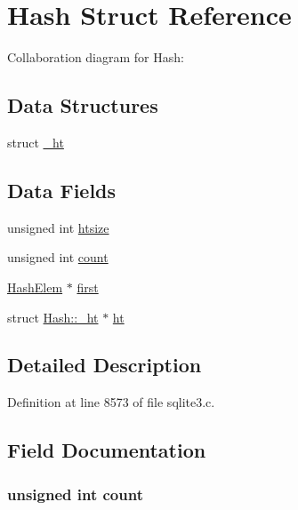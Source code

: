 \hypertarget{struct_hash}{}\section{Hash Struct Reference}
\label{struct_hash}


Collaboration diagram for Hash\+:
\subsection*{Data Structures}
\begin{DoxyCompactItemize}
\item 
struct \hyperlink{struct_hash_1_1__ht}{\+\_\+ht}
\end{DoxyCompactItemize}
\subsection*{Data Fields}
\begin{DoxyCompactItemize}
\item 
unsigned int \hyperlink{struct_hash_abed0ad9dee175658dd89a564ca90ee4e}{htsize}
\item 
unsigned int \hyperlink{struct_hash_a16ff2d8e15ade4948398b0aeb80124a8}{count}
\item 
\hyperlink{struct_hash_elem}{Hash\+Elem} $\ast$ \hyperlink{struct_hash_a0ef775d37aa0a53eac8c6510b0518690}{first}
\item 
struct \hyperlink{struct_hash_1_1__ht}{Hash\+::\+\_\+ht} $\ast$ \hyperlink{struct_hash_a38322464cd0d7254b9537661b4517e13}{ht}
\end{DoxyCompactItemize}


\subsection{Detailed Description}


Definition at line 8573 of file sqlite3.\+c.



\subsection{Field Documentation}
\hypertarget{struct_hash_a16ff2d8e15ade4948398b0aeb80124a8}{}
\subsubsection[{count}]{\setlength{\rightskip}{0pt plus 5cm}unsigned int count}\label{struct_hash_a16ff2d8e15ade4948398b0aeb80124a8}


